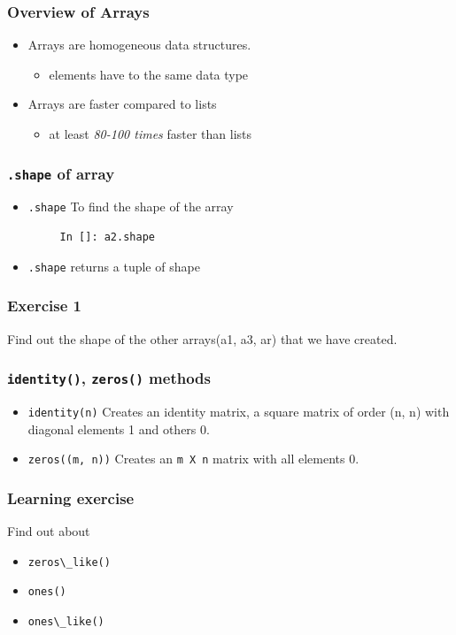 \documentclass[presentation]{beamer}
\begin{document}
\begin{frame}
\frametitle{Overview of Arrays}
\label{sec-4}


\begin{itemize}
\item Arrays are homogeneous data structures.
\begin{itemize}
\item elements have to the same data type
\end{itemize}
\item Arrays are faster compared to lists
\begin{itemize}
\item at least \emph{80-100 times} faster than lists
\end{itemize}
\end{itemize}
\end{frame}
\begin{frame}[fragile]
\frametitle{\verb~.shape~ of array}
\label{sec-5}


\begin{itemize}
\item \verb~.shape~
    To find the shape of the array
\begin{verbatim}
     In []: a2.shape
\end{verbatim}

\item \verb~.shape~
    returns a tuple of shape
\end{itemize}
\end{frame}
\begin{frame}
\frametitle{Exercise 1}
\label{sec-6}

  Find out the shape of the other arrays(a1, a3, ar) that we have created.
\end{frame}
\begin{frame}
\frametitle{\verb~identity()~, \verb~zeros()~ methods}
\label{sec-7}


\begin{itemize}
\item \verb~identity(n)~
    Creates an identity matrix, a square matrix of order (n, n) with diagonal elements 1 and others 0.
\item \verb~zeros((m, n))~
    Creates an \verb~m X n~ matrix with all elements 0.
\end{itemize}
\end{frame}
\begin{frame}
\frametitle{Learning exercise}
\label{sec-8}

  Find out about

\begin{itemize}
\item \verb~zeros\_like()~
\item \verb~ones()~
\item \verb~ones\_like()~
\end{itemize}
\end{frame}
\end{document}
